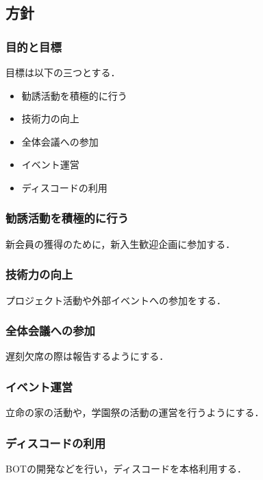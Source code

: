 \subsection*{\newGradeIfKouki{}\thirdGrade{}方針}



\subsubsection*{目的と目標}

目標は以下の三つとする．

\begin{itemize}
\item 勧誘活動を積極的に行う
\item 技術力の向上
\item 全体会議への参加
\item イベント運営
\item ディスコードの利用
\end{itemize}

\subsubsection*{勧誘活動を積極的に行う}
新会員の獲得のために，新入生歓迎企画に参加する．

\subsubsection*{技術力の向上}
プロジェクト活動や外部イベントへの参加をする．

\subsubsection*{全体会議への参加}
遅刻欠席の際は報告するようにする．

\subsubsection*{イベント運営}
立命の家の活動や，学園祭の活動の運営を行うようにする．

\subsubsection*{ディスコードの利用}
BOTの開発などを行い，ディスコードを本格利用する．
